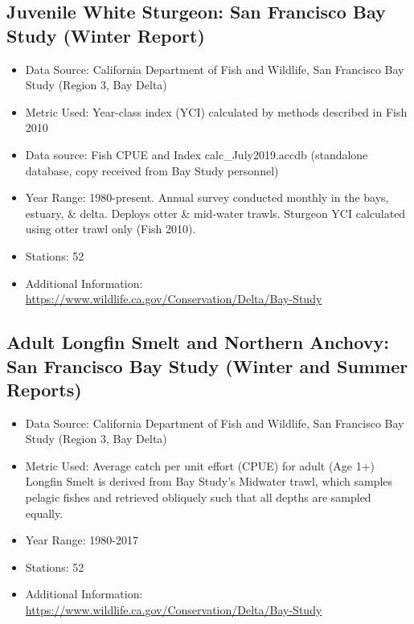 \documentclass[
]{book}
\providecommand{\tightlist}{%
  \setlength{\itemsep}{0pt}\setlength{\parskip}{0pt}}
\begin{document}
\hypertarget{juvenile-white-sturgeon-san-francisco-bay-study-winter-report}{%
\subsection{Juvenile White Sturgeon: San Francisco Bay Study (Winter Report)}\label{juvenile-white-sturgeon-san-francisco-bay-study-winter-report}}

\begin{itemize}
\tightlist
\item
  Data Source: California Department of Fish and Wildlife, San Francisco Bay Study (Region 3, Bay Delta)
\item
  Metric Used: Year-class index (YCI) calculated by methods described in Fish 2010
\item
  Data source: Fish CPUE and Index calc\_July2019.accdb (standalone database, copy received from Bay Study personnel)
\item
  Year Range: 1980-present. Annual survey conducted monthly in the bays, estuary, \& delta. Deploys otter \& mid-water trawls. Sturgeon YCI calculated using otter trawl only (Fish 2010).
\item
  Stations: 52
\item
  Additional Information: \url{https://www.wildlife.ca.gov/Conservation/Delta/Bay-Study}
\end{itemize}

\hypertarget{adult-longfin-smelt-and-northern-anchovy-san-francisco-bay-study-winter-and-summer-reports}{%
\subsection{Adult Longfin Smelt and Northern Anchovy: San Francisco Bay Study (Winter and Summer Reports)}\label{adult-longfin-smelt-and-northern-anchovy-san-francisco-bay-study-winter-and-summer-reports}}

\begin{itemize}
\tightlist
\item
  Data Source: California Department of Fish and Wildlife, San Francisco Bay Study (Region 3, Bay Delta)
\item
  Metric Used: Average catch per unit effort (CPUE) for adult (Age 1+) Longfin Smelt is derived from Bay Study's Midwater trawl, which samples pelagic fishes and retrieved obliquely such that all depths are sampled equally.
\item
  Year Range: 1980-2017
\item
  Stations: 52
\item
  Additional Information: \url{https://www.wildlife.ca.gov/Conservation/Delta/Bay-Study}
\end{itemize}
\end{document}
